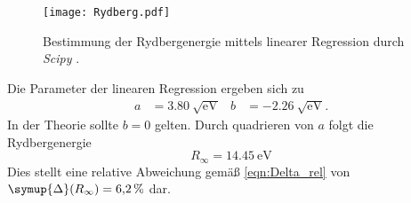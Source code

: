 \begin{figure}
  \centering
  \texttt{[image: Rydberg.pdf]}
  \caption{Bestimmung der Rydbergenergie mittels linearer Regression durch \textit{Scipy} \cite{scipy}.}
  \label{fig:Rydberg}
\end{figure}

Die Parameter der linearen Regression ergeben sich zu 
\begin{align*}
  a &= \qty{3.80}{\sqrt{\unit{\electronvolt}}} & b &= \qty{-2.26}{\sqrt{\unit{\electronvolt}}}.
\end{align*}
In der Theorie sollte $b = 0$ gelten. 
Durch quadrieren von $a$ folgt die Rydbergenergie
\begin{equation*}
  R_\infty = \qty{14.45}{\electronvolt}
\end{equation*}
Dies stellt eine relative Abweichung gemäß \autoref{eqn:Delta_rel} von $\symup{\Delta}(R_\infty) = \qty{6.2}{\percent}$ dar.
